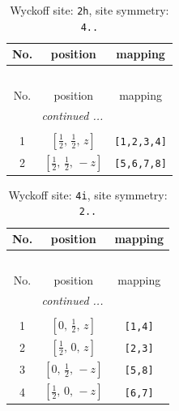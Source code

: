 \documentclass[fleqn,8pt]{jsarticle}
\begin{document}
\begin{longtable}{ccc}
\caption{Wyckoff site: {\tt 2h}, site symmetry: {\tt 4..}}
 \\
 \hline \hline
No. & position & mapping \\ \hline \endfirsthead

\multicolumn{2}{l}{\tablename\ \thetable{}} \\
 \hline \hline
No. & position & mapping \\ \hline \endhead

 \hline \hline
\multicolumn{2}{r}{\footnotesize\it continued ...} \\ \endfoot

 \hline \hline
\multicolumn{2}{r}{} \\ \endlastfoot

1 & $\left[ \frac{1}{2},\, \frac{1}{2},\, z \right]$ & {\tt [1,2,3,4]} \\ \hline
2 & $\left[ \frac{1}{2},\, \frac{1}{2},\, - z \right]$ & {\tt [5,6,7,8]} \\
\end{longtable}
\renewcommand{\arraystretch}{1.2}
\begin{longtable}{ccc}
\caption{Wyckoff site: {\tt 4i}, site symmetry: {\tt 2..}}
 \\
 \hline \hline
No. & position & mapping \\ \hline \endfirsthead

\multicolumn{2}{l}{\tablename\ \thetable{}} \\
 \hline \hline
No. & position & mapping \\ \hline \endhead

 \hline \hline
\multicolumn{2}{r}{\footnotesize\it continued ...} \\ \endfoot

 \hline \hline
\multicolumn{2}{r}{} \\ \endlastfoot

1 & $\left[ 0,\, \frac{1}{2},\, z \right]$ & {\tt [1,4]} \\ \hline
2 & $\left[ \frac{1}{2},\, 0,\, z \right]$ & {\tt [2,3]} \\ \hline
3 & $\left[ 0,\, \frac{1}{2},\, - z \right]$ & {\tt [5,8]} \\ \hline
4 & $\left[ \frac{1}{2},\, 0,\, - z \right]$ & {\tt [6,7]} \\
\end{longtable}
\renewcommand{\arraystretch}{1.2}
\end{document}
